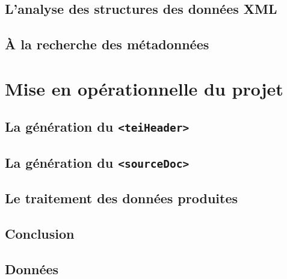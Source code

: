 \documentclass[a4paper,12pt,twoside]{book}
\begin{document}
	\chapter{L'analyse des structures des données XML}
	
	\label{chap:xml}
	
	\chapter{À la recherche des métadonnées}
	
	\label{chap:metadata}
	
	\part{Mise en opérationnelle du projet}
	
	\chapter{La génération du \texttt{<teiHeader>}}
	
	
	\chapter{La génération du \texttt{<sourceDoc>}}
	
	
	\chapter{Le traitement des données produites}
	
	
	\chapter*{Conclusion}
	
	
	
	\appendix
	\chapter{Données}
	
	
	\backmatter


	\listoffigures

	\listoftables

	\tableofcontents
	
\end{document}
